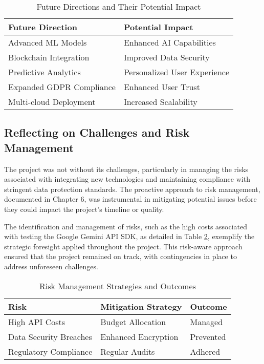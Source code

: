 \begin{table}[ht]
    \centering
    \begin{tabular}{|l|l|}
        \hline
        \textbf{Future Direction} & \textbf{Potential Impact} \\ \hline
        Advanced ML Models & Enhanced AI Capabilities \\ \hline
        Blockchain Integration & Improved Data Security \\ \hline
        Predictive Analytics & Personalized User Experience \\ \hline
        Expanded GDPR Compliance & Enhanced User Trust \\ \hline
        Multi-cloud Deployment & Increased Scalability \\ \hline
    \end{tabular}
    \caption{Future Directions and Their Potential Impact}
    \label{tab:future_directions}
\end{table}

\subsection{Reflecting on Challenges and Risk Management}
The project was not without its challenges, particularly in managing the risks associated with integrating new technologies and maintaining compliance with stringent data protection standards. The proactive approach to risk management, documented in Chapter 6, was instrumental in mitigating potential issues before they could impact the project's timeline or quality.

The identification and management of risks, such as the high costs associated with testing the \gls{Google} \gls{Gemini} \gls{API} SDK, as detailed in Table \ref{tab:risk_management}, exemplify the strategic foresight applied throughout the project. This risk-aware approach ensured that the project remained on track, with contingencies in place to address unforeseen challenges.

\begin{table}[ht]
    \centering
    \begin{tabular}{|l|l|l|}
        \hline
        \textbf{Risk} & \textbf{Mitigation Strategy} & \textbf{Outcome} \\ \hline
        High API Costs & Budget Allocation & Managed \\ \hline
        Data Security Breaches & Enhanced Encryption & Prevented \\ \hline
        Regulatory Compliance & Regular Audits & Adhered \\ \hline
    \end{tabular}
    \caption{Risk Management Strategies and Outcomes}
    \label{tab:risk_management}
\end{table}

